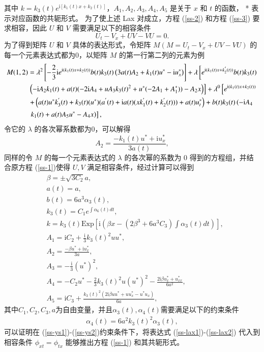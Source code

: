 其中 $k=k_{3}(t)e^{\mathrm{i}[k_{1}(t)x + k_{2}(t)]}$，$A_1, A_2, A_3, A_4, A_5$ 是关于 $x$ 和 $t$ 的函数，  * 表示对应函数的共轭形式。
为了使上述 Lax 对成立，方程 (\ref{ss-2}) 和方程 (\ref{ss-3}) 要求相容，因此 $U$ 和 $V$ 需要满足以下的相容条件
\begin{equation}
  U_t - V_x + UV - VU = 0.
\end{equation}
为了得到矩阵 $U$ 和 $V$ 具体的表达形式，令矩阵 $M (M = U_t - V_x + UV - VU)$ 的每一个元素表达式都为0，以矩阵 $M$ 的第一行第二列的元素为例
\begin{align}
  M(1,2)&=  \lambda^2\left[-\frac{2}{3}\mathrm{i}e^{\mathrm{i}(k_1(t)x+k_2(t))}b(t)k_3(t)\left(3a(t)A_2+k_1(t)u^*-\mathrm{i}u^*_x\right)\right] + \lambda \left[e^{\mathrm{i}(k_1(t)x+ k_2^{'}(t))}b(t)k_3(t) \right.  \notag\\
  & \left. \left(-\mathrm{i}A_2k_1(t)+a(t)(-2\mathrm{i}A_4+uA_3k_3(t)^2+u^*(-2A_1+A_1^*))-A_2x\right)\right] + \lambda^0 \left[e^{\mathrm{i}(k_1(t)x+k_2(t))} \right. \notag \\
  & \left. + \left(a(t)u^*k_3^{'}(t)+k_3(t)(u^*)(a^{'}(t)+ \mathrm{i}a(t)(xk_1^{'}(t)+ k_2^{'}(t)))+a(t)u^*_t\right)+b(t)k_3(t)\left(-\mathrm{i}A_4 \right. \right. \notag \\
  & \left. \left.k_1(t) +a(t)A_5u^*-A_4x\right)\right],
\end{align}
令它的 $\lambda$ 的各次幂系数都为0，可以解得
\begin{equation}
  A_2 = \frac{-k_1(t)u^*+\mathrm{i}u^*_x}{3a(t)},
\end{equation}
同样的令 $M$ 的每一个元素表达式的 $\lambda$ 的各次幂的系数为 0 得到的方程组，并结合原方程 (\ref{ss-1})使得 $U, V$ 满足相容条件，经过计算可以得到
\begin{align}
  & \beta = \pm \sqrt{3C_{2}}a, \label{ss-ys1}\\
  & a(t) = a, \\
  & b(t) = 6a^{3}\alpha_{3}(t), \\
  & k_{3}(t) = C_1e^{\int \alpha_{6}(t)dt},   \\
  & k = k_{3}(t)\mathrm{Exp}\left[\mathrm{i}\left(\beta x - (2\beta^{3} + 6a^{3}C_{3})\int \alpha_{3}(t)dt \right)\right], \\
  & A_{1} = \mathrm{i}C_{2} + \frac{\mathrm{i}}{3}k_{3}(t)^{2}uu^{*}, \\
  & A_{2} = \frac{-\beta u^{*} + \mathrm{i}u^{*}_{x}}{3a},   \\
  & A_{3} = -\frac{\mathrm{i}}{3}(u^{*})^{2},  \\
  & A_{4} = -C_{2}u^{*} - \frac{2}{3}k_{3}(t)^{2}u(u^{*})^{2} - \frac{2\mathrm{i}\beta u^{*}_{x} + u^{*}_{xx}}{6a^{2}}, \\
  & A_{5} = \mathrm{i}C_{3} + \frac{k_{3}(t)^{2}(2\mathrm{i}\beta uu^{*} + uu^{*}_{x} - u^{*}u_{x})}{6a}, \label{ss-ys2}
\end{align}
其中$C_1, C_{2}, C_{3}, a$为自由变量，并且$\alpha_{3}(t), \alpha_{4}(t)$需要满足以下的约束条件
\begin{align}
  \alpha_{4}(t) = 6a^{2}k_{3}(t)^{2}\alpha_{3}(t),
\end{align}
可以证明在 (\ref{ss-ys1})-(\ref{ss-ys2})约束条件下，将表达式 (\ref{ss-lax1})-(\ref{ss-lax2}) 代入到相容条件  $\phi_{xt} = \phi_{tx}$ 能够推出方程 (\ref{ss-1}) 和其共轭形式。

